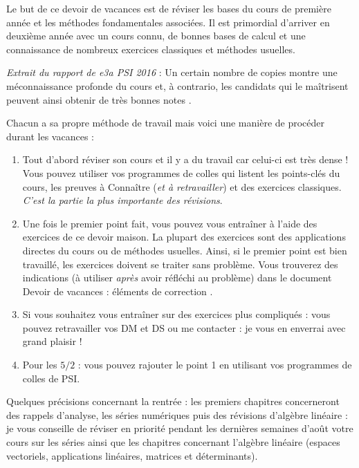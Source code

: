 \documentclass[a4paper,twoside,french,10pt]{VcCours}
\begin{document}



Le but de ce devoir de vacances est de réviser les bases du cours de première année et les méthodes fondamentales associées. Il est primordial d'arriver en deuxième année avec un cours connu, de bonnes bases de calcul et une connaissance de nombreux exercices classiques et méthodes usuelles.

\medskip


\textit{Extrait du rapport de e3a PSI 2016} : \og Un certain nombre de copies montre une méconnaissance profonde du cours et, à contrario, les candidats qui le maîtrisent peuvent ainsi obtenir de très bonnes notes \fg .

\medskip

Chacun a sa propre méthode de travail mais voici une manière de procéder durant les vacances :

\begin{enumerate}
\item Tout d'abord réviser son cours et il y a du travail car celui-ci est très dense ! Vous pouvez utiliser vos programmes de colles qui listent les points-clés du cours, les preuves à Connaître (\textit{et à retravailler}) et des exercices classiques. \textit{C'est la partie la plus importante des révisions}.
\item Une fois le premier point fait, vous pouvez vous entraîner à l'aide des exercices de ce devoir maison. La plupart des exercices sont des applications directes du cours ou de méthodes usuelles. Ainsi, si le premier point est bien travaillé, les exercices doivent se traiter sans problème. Vous trouverez des indications (à utiliser \textit{après} avoir réfléchi au problème) dans le document \og Devoir de vacances : éléments de correction \fg .
\item Si vous souhaitez vous entraîner sur des exercices plus compliqués : vous pouvez retravailler vos DM et DS ou me contacter : je vous en enverrai avec grand plaisir !
\item Pour les $5/2$ : vous pouvez rajouter le point 1 en utilisant vos programmes de colles de PSI.
\end{enumerate}

\medskip

Quelques précisions concernant la rentrée : les premiers chapitres concerneront des rappels d'analyse, les séries numériques puis des révisions d'algèbre linéaire : je vous conseille de réviser en priorité pendant les dernières semaines d'août votre cours sur les séries ainsi que les chapitres concernant l'algèbre linéaire (espaces vectoriels, applications linéaires, matrices et déterminants).
\end{document}
